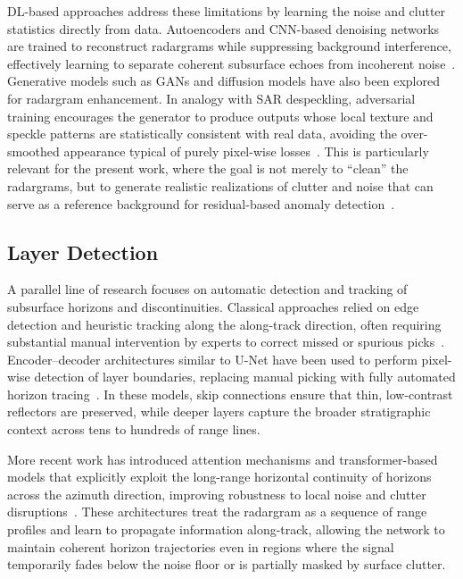 DL-based approaches address these limitations by learning the noise and clutter statistics directly from data.
Autoencoders and CNN-based denoising networks are trained to reconstruct radargrams while suppressing background interference, effectively learning to separate coherent subsurface echoes from incoherent noise~\cite{yebasse2025advances}.
Generative models such as GANs and diffusion models have also been explored for radargram enhancement.
In analogy with SAR despeckling, adversarial training encourages the generator to produce outputs whose local texture and speckle patterns are statistically consistent with real data, avoiding the over-smoothed appearance typical of purely pixel-wise losses~\cite{Li2022SRGANRemoteSensing,Arjovsky2017}.
This is particularly relevant for the present work, where the goal is not merely to \enquote{clean} the radargrams, but to generate realistic realizations of clutter and noise that can serve as a reference background for residual-based anomaly detection~\cite{yebasse2025advances}.

\subsection{Layer Detection}
A parallel line of research focuses on automatic detection and tracking of subsurface horizons and discontinuities.
Classical approaches relied on edge detection and heuristic tracking along the along-track direction, often requiring substantial manual intervention by experts to correct missed or spurious picks~\cite{Daniels_2004,Seu_2007}.
Encoder–decoder architectures similar to U-Net have been used to perform pixel-wise detection of layer boundaries, replacing manual picking with fully automated horizon tracing~\cite{yebasse2025advances}.
In these models, skip connections ensure that thin, low-contrast reflectors are preserved, while deeper layers capture the broader stratigraphic context across tens to hundreds of range lines.

More recent work has introduced attention mechanisms and transformer-based models that explicitly exploit the long-range horizontal continuity of horizons across the azimuth direction, improving robustness to local noise and clutter disruptions~\cite{yebasse2025advances}.
These architectures treat the radargram as a sequence of range profiles and learn to propagate information along-track, allowing the network to maintain coherent horizon trajectories even in regions where the signal temporarily fades below the noise floor or is partially masked by surface clutter.

